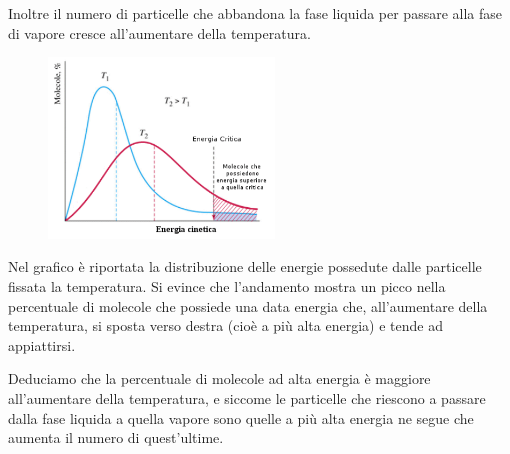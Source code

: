 Inoltre il numero di particelle che abbandona la fase liquida per passare alla fase di vapore cresce all'aumentare della temperatura.

\hspace{0.5cm}\begin{minipage}{0.5 \textwidth}
    \begin{figure}[H]
        \includegraphics[width=6cm]{immagini/energie_fase_liquida.png}
    \end{figure}
\end{minipage}
\begin{minipage}{0.45 \textwidth}
\vspace{0.5cm}Nel grafico è riportata la distribuzione delle energie possedute dalle particelle fissata la temperatura. Si evince che l'andamento mostra un picco nella percentuale di molecole che possiede una data energia che, all'aumentare della temperatura, si sposta verso destra (cioè a più alta energia) e tende ad appiattirsi.
\end{minipage}

Deduciamo che la percentuale di molecole ad alta energia è maggiore all'aumentare della temperatura, e siccome le particelle che riescono a passare dalla fase liquida a quella vapore sono quelle a più alta energia ne segue che aumenta il numero di quest'ultime.

